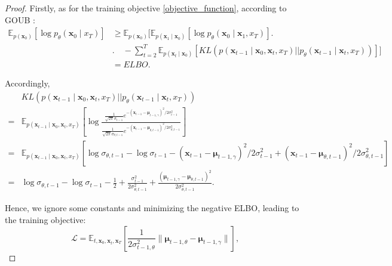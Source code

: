 \begin{proof}
Firstly, as for the training objective \eqref{objective_function}, according to GOUB \cite{yue2024imagerestorationgeneralizedornsteinuhlenbeck}:
\begin{equation}
\begin{aligned}
\mathbb{E}_{p(\mathbf{x}_0)} [\log p_{\theta}(\mathbf{x}_{0}\mid x_T)] &\geq \mathbb{E}_{p(\mathbf{x}_0)}\Bigg[ \mathbb{E} _{p\left( \mathbf{x}_1\mid \mathbf{x}_0 \right)}\left[ \log p_{\theta}\left( \mathbf{x}_0\mid \mathbf{x}_1, x_T \right) \right] \Bigg. \\ & \Bigg. \quad - \sum_{t=2}^T \mathbb{E}_{p(\mathbf{x}_t\mid \mathbf{x}_0)} [{KL\left( p\left( \mathbf{x}_{t-1}\mid \mathbf{x}_0, \mathbf{x}_t, x_T \right) ||p_{\theta}\left( \mathbf{x}_{t-1}\mid \mathbf{x}_t, x_T \right) \right)}]\Bigg]\\
&=ELBO.
\end{aligned}
\end{equation}

Accordingly, 
\begin{equation}
\begin{aligned}
&KL\left( p\left( \mathbf{x}_{t-1}\mid \mathbf{x}_0, \mathbf{x}_t, x_T \right) ||p_{\theta}\left( \mathbf{x}_{t-1}\mid \mathbf{x}_t,x_T \right) \right)\\
=&\mathbb{E}_{p\left( \mathbf{x}_{t-1}\mid \mathbf{x}_0, \mathbf{x}_t, x_T \right)}\left[\log \frac{ \frac{1}{\sqrt{2\pi}\sigma_{t-1}}e^{-(\mathbf x_{t-1}-\boldsymbol{\mu}_{t-1, \gamma})^2/{2\sigma_{t-1}^2}} } {\frac{1}{\sqrt{2\pi}\sigma_{\theta,t-1}}e^{-(\mathbf x_{t-1}-{\boldsymbol{\mu}}_{\theta,t-1})^2/{2\sigma_{\theta,t-1}^2}}} \right]\\ 
=&\mathbb{E}_{p\left( \mathbf{x}_{t-1}\mid \mathbf{x}_0, \mathbf{x}_t, x_T \right)}\left[\log\sigma_{\theta,t-1} - \log\sigma_{t-1} - (\mathbf x_{t-1}-\boldsymbol{\mu}_{t-1, \gamma})^2/{2\sigma^{2}_{t-1}} + (\mathbf x_{t-1}-{\boldsymbol{\mu}}_{\theta,t-1})^2/{2\sigma_{\theta,t-1}^{2}} \right]\\ 
=&\log\sigma_{\theta,t-1}-\log\sigma_{t-1}-\frac{1}{2} + \frac{\sigma_{t-1}^2}{2\sigma_{\theta,t-1}^2} + \frac{(\boldsymbol{\mu}_{t-1, \gamma}-{\boldsymbol{\mu}}_{\theta,t-1})^2}{2\sigma_{\theta,t-1}^2}.
\end{aligned}
\end{equation}

Hence, we ignore some constants and minimizing the negative ELBO, leading to the training objective: 
\begin{equation}
\mathcal{L} =\mathbb{E}_{t, \mathbf{x}_0, \mathbf{x}_t, \mathbf{x}_T} \left[ \frac{1}{2\sigma_{t-1, \theta}^2} \| \boldsymbol{\mu}_{t-1, \theta} - \boldsymbol{\mu}_{t-1, \gamma} \| \right] ,
\end{equation}


\end{proof}
